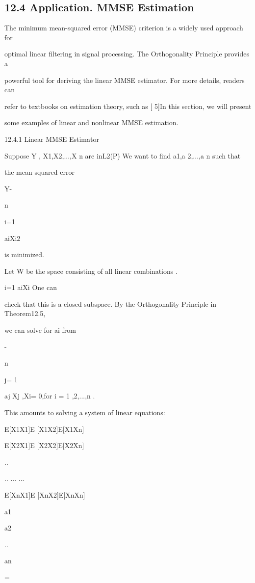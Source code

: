 \subsection*{12.4 Application. MMSE Estimation}

The minimum mean-squared error (MMSE) criterion is a widely used approach for

optimal linear filtering in signal processing. The Orthogonality Principle provides a

powerful tool for deriving the linear MMSE estimator. For more details, readers can

refer to textbooks on estimation theory, such as [ 5]In this section, we will present

some examples of linear and nonlinear MMSE estimation.

12.4.1 Linear MMSE Estimator

Suppose Y , X1,X2,...,X n are inL2(P) We want to find a1,a 2,...,a n such that

the mean-squared error

Y-

n\sum

i=1

aiXi2

is minimized.

Let W be the space consisting of all linear combinations .

\sumn

i=1 aiXi One can

check that this is a closed subspace. By the Orthogonality Principle in Theorem12.5,

we can solve for ai from

\langleY-

n\sum

j= 1

aj Xj ,Xi\rangle= 0,for i = 1 ,2,...,n .

This amounts to solving a system of linear equations:

E[X1X1]E [X1X2]\cdot\cdot\cdot E[X1Xn]

E[X2X1]E [X2X2]\cdot\cdot\cdot E[X2Xn]

..

.. ... ...

E[XnX1]E [XnX2]\cdot\cdot\cdot E[XnXn]

a1

a2

..

an

=

